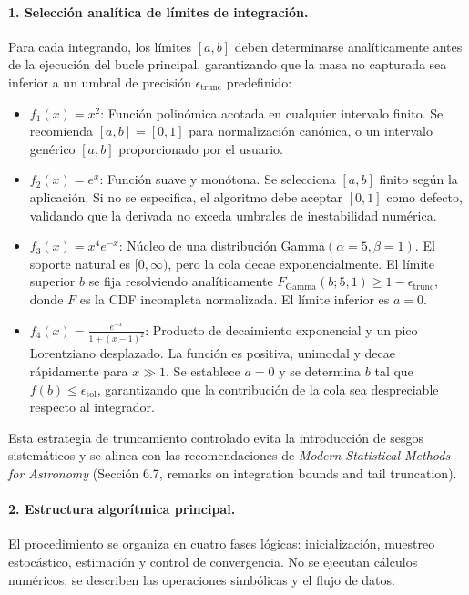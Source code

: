 \documentclass[12pt]{article}
\begin{document}
\paragraph{1. Selección analítica de límites de integración.}
Para cada integrando, los límites $[a,b]$ deben determinarse analíticamente antes de la ejecución del bucle principal, garantizando que la masa no capturada sea inferior a un umbral de precisión $\epsilon_{\text{trunc}}$ predefinido:
\begin{itemize}
\item $f_1(x) = x^2$: Función polinómica acotada en cualquier intervalo finito. Se recomienda $[a,b] = [0,1]$ para normalización canónica, o un intervalo genérico $[a,b]$ proporcionado por el usuario.
\item $f_2(x) = e^x$: Función suave y monótona. Se selecciona $[a,b]$ finito según la aplicación. Si no se especifica, el algoritmo debe aceptar $[0,1]$ como defecto, validando que la derivada no exceda umbrales de inestabilidad numérica.
\item $f_3(x) = x^4 e^{-x}$: Núcleo de una distribución Gamma$(\alpha=5, \beta=1)$. El soporte natural es $[0, \infty)$, pero la cola decae exponencialmente. El límite superior $b$ se fija resolviendo analíticamente $F_{\text{Gamma}}(b; 5, 1) \geq 1 - \epsilon_{\text{trunc}}$, donde $F$ es la CDF incompleta normalizada. El límite inferior es $a=0$.
\item $f_4(x) = \frac{e^{-x}}{1 + (x - 1)^2}$: Producto de decaimiento exponencial y un pico Lorentziano desplazado. La función es positiva, unimodal y decae rápidamente para $x \gg 1$. Se establece $a=0$ y se determina $b$ tal que $f(b) \leq \epsilon_{\text{tol}}$, garantizando que la contribución de la cola sea despreciable respecto al integrador.
\end{itemize}
Esta estrategia de truncamiento controlado evita la introducción de sesgos sistemáticos y se alinea con las recomendaciones de \textit{Modern Statistical Methods for Astronomy} (Sección 6.7, remarks on integration bounds and tail truncation).

\paragraph{2. Estructura algorítmica principal.}
El procedimiento se organiza en cuatro fases lógicas: inicialización, muestreo estocástico, estimación y control de convergencia. No se ejecutan cálculos numéricos; se describen las operaciones simbólicas y el flujo de datos.
\end{document}
